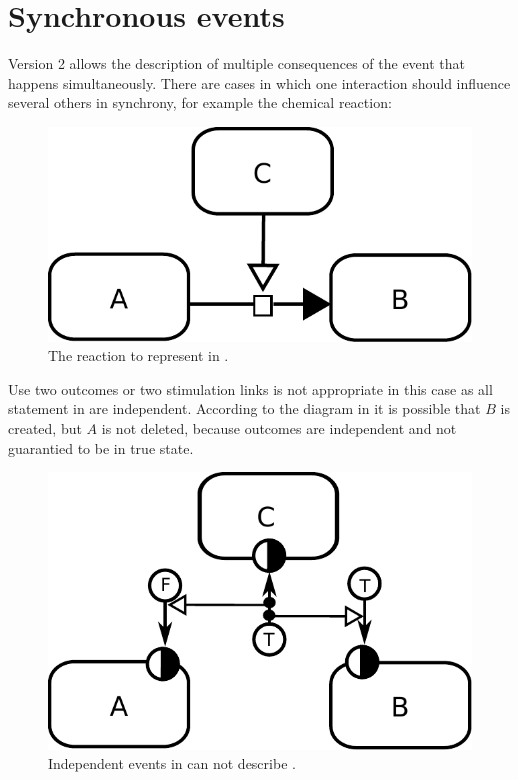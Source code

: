 \section{Synchronous events}\label{sec:syncev}

\SBGNERLone Version 2 allows the description of multiple consequences of the event that happens simultaneously. There are cases in which one interaction should influence several others in synchrony, for example the chemical reaction:

\begin{figure}[H]
  \centering
  \includegraphics[scale = 0.75]{images/synchronous-PD}
  \caption{The reaction to represent in \ER.}
  \label{fig:synchronousPD}
\end{figure}

Use two outcomes or two stimulation links  is not appropriate in this case as all statement in \ER are independent. According to the diagram in  it is possible that  $B$ is created, but  $A$ is not deleted, because outcomes are independent and not guarantied to be in true state. 

\begin{figure}[H]
  \centering
  \includegraphics[scale = 0.75]{images/asynchronous}
  \caption{Independent events in \ER can not describe .}
  \label{fig:asynchronous}
\end{figure}


